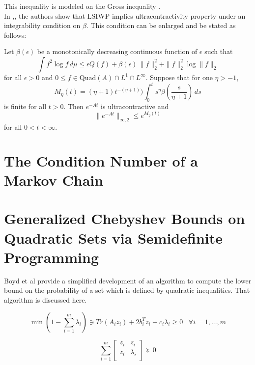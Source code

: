 This inequality is modeled on the Gross inequality \cite{}.
\\

In \cite{ds},\cite{d}, the authors show that LSIWP implies
ultracontractivity property  under an integrability condition on $\beta$. This condition can be enlarged and be stated as follows:

\begin{thm}
Let ${\beta}(\epsilon)$ be a monotonically decreasing continuous
function of $\epsilon$
such that
\begin{equation}\label{vareps}
\int f^2\log f \, d{\mu}\leq
\epsilon Q(f) +{\beta}(\epsilon)\, \|f\|^2_2 + \|f\|^2_2\log \|f\|_2
\end{equation}
for all $\epsilon >0$ and $0\leq f\in \mbox{Quad}(A)\cap L^1\cap
L^{\infty}$. Suppose that
for one ${\eta}>-1$,
\begin{equation}\label{integral}
M_{\eta}(t)=({\eta}+1)t^{-({\eta}+1)})\int_0^t
{s}^{\eta}{\beta}\left(\frac{s}{\eta+1}\right)
\,ds
 \end{equation}
is finite for  all $t>0$. Then $e^{-At}$ is ultracontractive
and
\begin{equation}\label{majo}
\| e^{-At} \|_{\infty,2}\leq e^{M_{\eta}(t)}
\end{equation}
for all $0<t<\infty$.
\end{thm}


\section{The Condition Number of a Markov Chain}
\section{Generalized Chebyshev Bounds on Quadratic Sets via Semidefinite Programming}
Boyd et al  \citet{SDPVandenberghe_generalizedchebyshev} provide a simplified development of an algorithm to compute the lower bound on the probability of a set which is defined by quadratic inequalities. That algorithm is discussed here.

\begin{equation}
\min (1-  \sum\limits_{i=1}^{m} \lambda_i)  \ni Tr( A_i z_i) + 2 b_{i}^{T} z_i + c_i \lambda_i \geqslant 0 \;\;\; \forall i=1, ... , m
\end{equation}

\begin{equation}  \sum\limits_{i=1}^{m}  [
\begin{array}{cc}
z_i & z_i \\
z_i & \lambda_i \\
\end{array} ] \succeq 0 \end{equation}

